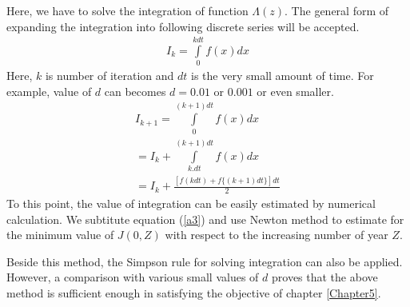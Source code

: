 Here, we have to solve the integration of function $\Lambda (z)$. The general form of expanding the integration into following discrete series will be accepted.
\begin{eqnarray}
I_k  = \int\limits_0^{kdt} {f(x)dx} 
\end{eqnarray}
Here, $k$ is number of iteration and $dt$ is the very small amount of time. For example, value of $d$ can becomes $d=0.01$ or $0.001$ or even smaller. 
\begin{eqnarray}
I_{k + 1}  = \int\limits_0^{(k + 1)dt} {f(x)dx} \\
=I_k  + \int\limits_{k.dt}^{(k + 1)dt} {f(x)dx} \\
= I_k  + \frac{{[f(kdt) + f\{ (k + 1)dt\} ]dt}}{2} \label{i1}
\end{eqnarray}
To this point, the value of integration can be easily estimated by numerical calculation. We subtitute equation (\ref{a3}) and use Newton method to estimate for the minimum value of $J(0,Z)$ with respect to the increasing number of year $Z$.

Beside this method, the Simpson rule for solving integration can also be applied. However, a comparison with various small values of $d$ proves that the above method is sufficient enough in satisfying the objective of chapter \ref{Chapter5}.


